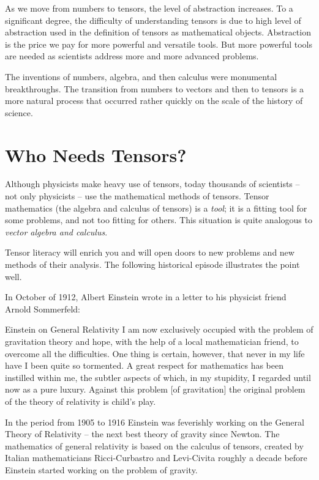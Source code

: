 As we move from numbers to tensors, the level of abstraction
increases. To a significant degree, the difficulty of understanding
tensors is due to high level of abstraction used in the definition
of tensors as mathematical objects. Abstraction is the price we pay
for more powerful and versatile tools. But more powerful tools are
needed as scientists address more and more advanced problems.

The inventions of numbers, algebra, and then calculus were monumental
breakthroughs. The transition from numbers to vectors and then to
tensors is a more natural process that occurred rather quickly on
the scale of the history of science.


 \section{Who Needs Tensors?}
Although physicists make heavy use of tensors, today thousands of
scientists -- not only physicists -- use
the mathematical methods of tensors. Tensor mathematics (the algebra
and calculus of tensors) is a \emph{tool}; it is a fitting tool for
some problems, and not too fitting for others. This
situation is quite analogous to \emph{vector algebra and calculus}.


Tensor literacy will enrich you and will open doors to new
problems and new methods of their analysis. The following historical
episode illustrates the point well.

In October of 1912, Albert Einstein wrote in a letter to his physicist
friend Arnold Sommerfeld:
\begin{mybio}{Einstein on General Relativity}
  I am now exclusively occupied with the problem of gravitation theory
and hope, with the help of a local mathematician friend, to overcome
all the difficulties. One thing is certain, however, that never in my
life have I been quite so tormented. A great respect for mathematics
has been instilled within me, the subtler aspects of which, in my stupidity,
I regarded until now as a pure luxury. Against this problem [of
  gravitation] the original problem of the theory of relativity is
child’s play.
\end{mybio}
In the period from 1905 to 1916 Einstein was feverishly working on the
General Theory of Relativity -- the next
best theory of gravity since
Newton. The mathematics of general relativity is based on the calculus
of tensors, created by Italian mathematicians Ricci-Curbastro and
Levi-Civita roughly a decade before Einstein started working on the
problem of gravity.

